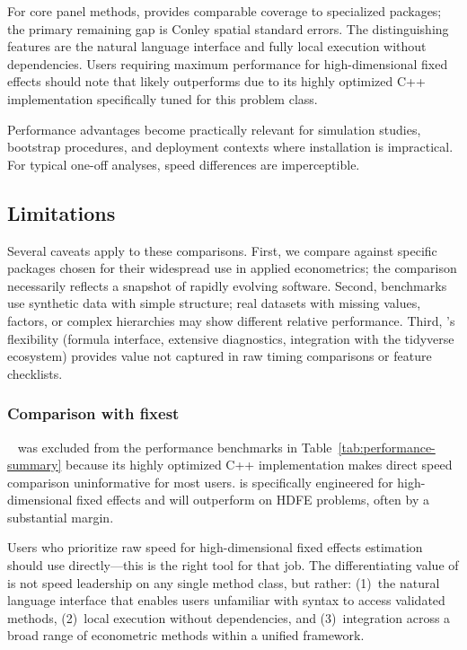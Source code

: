 For core panel methods,  provides comparable coverage
to specialized packages; the primary remaining gap is Conley spatial standard
errors. The distinguishing features are the natural language interface and
fully local execution without  dependencies. Users requiring
maximum performance for high-dimensional fixed effects should note that
 likely outperforms  due to its highly
optimized C++ implementation specifically tuned for this problem class.

Performance advantages become practically relevant for simulation
studies, bootstrap procedures, and deployment contexts where 
installation is impractical. For typical one-off analyses, speed differences
are imperceptible.

\subsection{Limitations}

Several caveats apply to these comparisons. First, we compare against specific
 packages chosen for their widespread use in applied econometrics;
the comparison necessarily reflects a snapshot of rapidly evolving software.
Second, benchmarks use synthetic data with simple structure; real datasets
with missing values, factors, or complex hierarchies may show different
relative performance. Third, 's flexibility (formula interface,
extensive diagnostics, integration with the tidyverse ecosystem) provides
value not captured in raw timing comparisons or feature checklists.

\subsubsection{Comparison with fixest}

~\citep{Berge:2018} was excluded from the performance benchmarks
in Table~\ref{tab:performance-summary} because its highly optimized C++
implementation makes direct speed comparison uninformative for most users.
 is specifically engineered for high-dimensional fixed effects
and will outperform  on HDFE problems, often by a
substantial margin.

Users who prioritize raw speed for high-dimensional fixed effects estimation
should use  directly---this is the right tool for that job.
The differentiating value of  is not speed leadership
on any single method class, but rather: (1)~the natural language interface
that enables users unfamiliar with  syntax to access validated
methods, (2)~local execution without  dependencies, and
(3)~integration across a broad range of econometric methods within a
unified framework.

